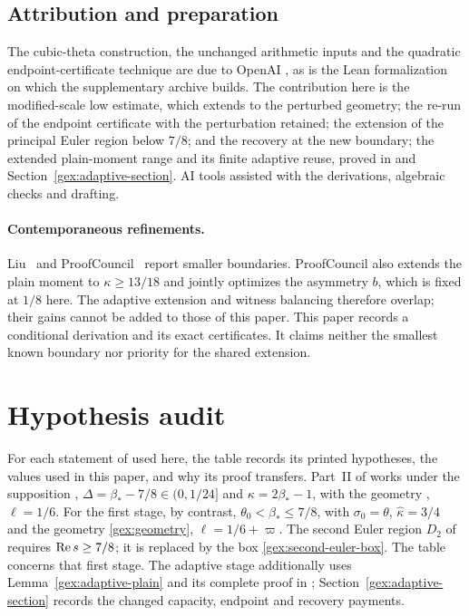 \subsection*{Attribution and preparation}

The cubic-theta construction, the unchanged arithmetic inputs and the
quadratic endpoint-certificate technique \cite[Lemma 20.2]{OAI26} are
due to OpenAI \cite{OAI26}, as is the Lean formalization on which the
supplementary archive builds. The contribution here is the
modified-scale low estimate, which extends \cite[Lemma 15.1 and
Proposition 15.3]{OAI26} to the perturbed geometry; the re-run of the
endpoint certificate with the perturbation retained; the extension of
the principal Euler region below $7/8$; and the recovery at the new
boundary; the extended plain-moment range and its finite adaptive
reuse, proved in \cite{GaoAdaptive26} and
Section~\ref{gex:adaptive-section}. AI tools assisted with the derivations, algebraic checks and
drafting.

\paragraph{Contemporaneous refinements.}
Liu~\cite{LIU26} and ProofCouncil~\cite{PC26} report smaller boundaries.
ProofCouncil also extends the plain moment to $\kappa\ge13/18$ and
jointly optimizes the asymmetry $b$, which is fixed at $1/8$ here.
The adaptive extension and witness balancing therefore overlap;
their gains cannot be added to those of this paper. This paper records
a conditional derivation and its exact certificates. It claims neither
the smallest known boundary nor priority for the shared extension.

\appendix
\section{Hypothesis audit}\label{gex:audit}

For each statement of \cite{OAI26} used here, the table records its
printed hypotheses, the values used in this paper, and why its proof
transfers. Part~II of \cite{OAI26} works under the supposition
\cite[(12.1)]{OAI26}, $\Delta=\beta_*-7/8\in(0,1/24]$ and
$\kappa=2\beta_*-1$, with the geometry \cite[(12.4)]{OAI26},
$\ell=1/6$. For the first stage, by contrast, $\theta_0<\beta_*\le7/8$, with
$\sigma_0=\theta$, $\widehat\kappa=3/4$ and the geometry
\eqref{gex:geometry}, $\ell=1/6+\varpi$. The second Euler region
$D_2$ of \cite[Section 10.2]{OAI26} requires $\operatorname{Re} s\ge7/8$; it is
replaced by the box \eqref{gex:second-euler-box}.
The table concerns that first stage. The adaptive stage additionally
uses Lemma~\ref{gex:adaptive-plain} and its complete proof in
\cite{GaoAdaptive26}; Section~\ref{gex:adaptive-section} records the
changed capacity, endpoint and recovery payments.

